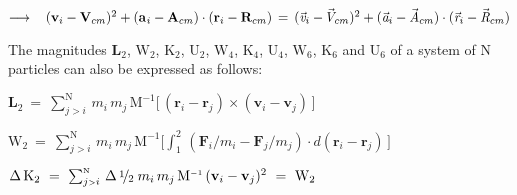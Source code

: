 \documentclass[10pt]{article}
\newcommand{\med}{\raise.5ex\hbox{$\scriptstyle 1$}\kern-.15em/\kern-.09em\lower.25ex\hbox{$\scriptstyle 2$}}
\begin{document}
\par \bigskip\smallskip \noindent $\longrightarrow \hspace{+0.90em} ({\mathbf{v}}_i - {\mathbf{V}}_{cm})^2 + ({\mathbf{a}}_{\hspace{+0.045em}i} - {\mathbf{A}}_{cm}) \cdot ({\mathbf{r}}_i - {\mathbf{R}}_{cm}) \,=\, ({\vec{\mathit{v}}}_i - \hspace{-0.120em}{\vec{\mathit{V}}}_{cm})^2 + ({\vec{\mathit{a}}}_i - {\vec{\mathit{A}}}_{cm}) \cdot ({\vec{\mathit{r}}}_i - {\vec{\mathit{R}}}_{cm})$

\newpage

\par {}

\par {}

\par \bigskip \noindent The magnitudes ${\mathbf{L}}_2$, ${\mathrm{W}}_2$, ${\mathrm{K}}_2$, ${\mathrm{U}}_2$, ${\mathrm{W}}_4$, ${\mathrm{K}}_4$, ${\mathrm{U}}_4$, ${\mathrm{W}}_6$, ${\mathrm{K}}_6$ and ${\mathrm{U}}_6$ of a system of N particles can also be expressed as follows:

\par \bigskip\bigskip \noindent ${\mathbf{L}}_2 ~=~ \sum_{j{\scriptscriptstyle >}i}^{\scriptscriptstyle{\mathrm{N}}} \, m_i \, m_j \, {\mathrm{M}}^{\scriptscriptstyle -1} \big [ \, ({\mathbf{r}}_{i} - {\mathbf{r}}_{j}) \times ({\mathbf{v}}_{i} - {\mathbf{v}}_{j}) \, \big ]$

\par \bigskip\bigskip \noindent ${\mathrm{W}}_2 ~=~ \sum_{j{\scriptscriptstyle >}i}^{\scriptscriptstyle{\mathrm{N}}} \, m_i \, m_j \, {\mathrm{M}}^{\scriptscriptstyle -1} \big [ \int_{\scriptscriptstyle 1}^{\scriptscriptstyle 2} \, ({\mathbf{F}}_i / m_i - {\mathbf{F}}_j / m_j) \cdot d({\mathbf{r}}_{i} - {\mathbf{r}}_{j}) \, \big ]$

\par \bigskip\smallskip \noindent $\Delta \, {\mathrm{K}}_2 ~=~ \sum_{j{\scriptscriptstyle >}i}^{\scriptscriptstyle{\mathrm{N}}} \, \Delta \, \med \; m_i \, m_j \, {\mathrm{M}}^{\scriptscriptstyle -1} \, ({\mathbf{v}}_{i} - {\mathbf{v}}_{j})^2 ~=~ {\mathrm{W}}_2$
\end{document}
